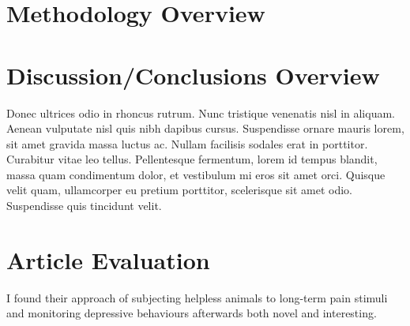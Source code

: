\documentclass[
10pt, %
letterpaper, %
twocolumn, %
landscape %
]{article}
\begin{document}
\section{Methodology Overview} %


\section{Discussion/Conclusions Overview}

Donec ultrices odio in rhoncus rutrum. Nunc tristique venenatis nisl in aliquam. Aenean vulputate nisl quis nibh dapibus cursus. Suspendisse ornare mauris lorem, sit amet gravida massa luctus ac. Nullam facilisis sodales erat in porttitor. Curabitur vitae leo tellus. Pellentesque fermentum, lorem id tempus blandit, massa quam condimentum dolor, et vestibulum mi eros sit amet orci. Quisque velit quam, ullamcorper eu pretium porttitor, scelerisque sit amet odio. Suspendisse quis tincidunt velit. 


\section*{Article Evaluation}

I found their approach of subjecting helpless animals to long-term pain stimuli and monitoring depressive behaviours afterwards both novel and interesting.


\renewcommand{\refname}{Reference} %


\end{document}
